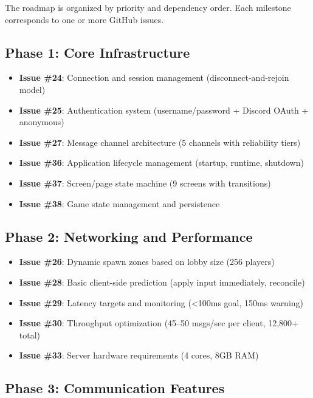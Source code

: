 \documentclass[11pt]{article}
\begin{document}
The roadmap is organized by priority and dependency order. Each milestone corresponds to one or more GitHub issues.

\subsection{Phase 1: Core Infrastructure}

\begin{itemize}
  \item \textbf{Issue \#24}: Connection and session management (disconnect-and-rejoin model)
  \item \textbf{Issue \#25}: Authentication system (username/password + Discord OAuth + anonymous)
  \item \textbf{Issue \#27}: Message channel architecture (5 channels with reliability tiers)
  \item \textbf{Issue \#36}: Application lifecycle management (startup, runtime, shutdown)
  \item \textbf{Issue \#37}: Screen/page state machine (9 screens with transitions)
  \item \textbf{Issue \#38}: Game state management and persistence
\end{itemize}

\subsection{Phase 2: Networking and Performance}

\begin{itemize}
  \item \textbf{Issue \#26}: Dynamic spawn zones based on lobby size (256 players)
  \item \textbf{Issue \#28}: Basic client-side prediction (apply input immediately, reconcile)
  \item \textbf{Issue \#29}: Latency targets and monitoring (<100ms goal, 150ms warning)
  \item \textbf{Issue \#30}: Throughput optimization (45--50 msgs/sec per client, 12,800+ total)
  \item \textbf{Issue \#33}: Server hardware requirements (4 cores, 8GB RAM)
\end{itemize}

\subsection{Phase 3: Communication Features}
\end{document}
